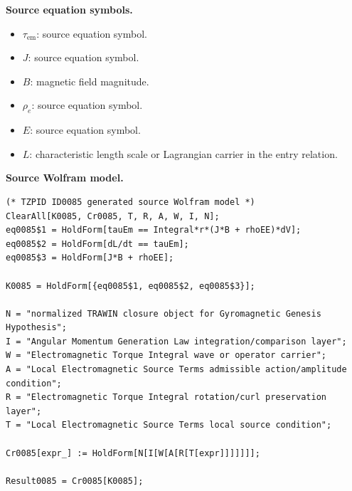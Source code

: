 \begin{minipage}[t]{0.49\linewidth}
\begingroup
\small
\raggedright
\textbf{Source equation symbols.}\par
\begin{itemize}[leftmargin=1.35em,itemsep=1pt,topsep=1pt,parsep=0pt]
    \item $\tau_{\mathrm{em}}$: source equation symbol.
    \item $J$: source equation symbol.
    \item $B$: magnetic field magnitude.
    \item $\rho_e$: source equation symbol.
    \item $E$: source equation symbol.
    \item $L$: characteristic length scale or Lagrangian carrier in the entry relation.
\end{itemize}
\endgroup
\end{minipage}\hfill
\begin{minipage}[t]{0.47\linewidth}
\begingroup
\scriptsize
\raggedright
\textbf{Source Wolfram model.}\par
\begin{Verbatim}[fontsize=\tiny,breaklines=true,breakanywhere=true]
(* TZPID ID0085 generated source Wolfram model *)
ClearAll[K0085, Cr0085, T, R, A, W, I, N];
eq0085$1 = HoldForm[tauEm == Integral*r*(J*B + rhoEE)*dV];
eq0085$2 = HoldForm[dL/dt == tauEm];
eq0085$3 = HoldForm[J*B + rhoEE];

K0085 = HoldForm[{eq0085$1, eq0085$2, eq0085$3}];

N = "normalized TRAWIN closure object for Gyromagnetic Genesis Hypothesis";
I = "Angular Momentum Generation Law integration/comparison layer";
W = "Electromagnetic Torque Integral wave or operator carrier";
A = "Local Electromagnetic Source Terms admissible action/amplitude condition";
R = "Electromagnetic Torque Integral rotation/curl preservation layer";
T = "Local Electromagnetic Source Terms local source condition";

Cr0085[expr_] := HoldForm[N[I[W[A[R[T[expr]]]]]]];

Result0085 = Cr0085[K0085];
\end{Verbatim}
\endgroup
\end{minipage}

